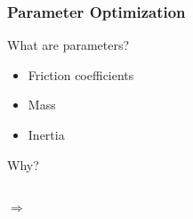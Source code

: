 \begin{frame}[c]
	\frametitle{Parameter Optimization}
	What are parameters?
	\begin{itemize}
		\item{Friction coefficients}
		\item{Mass}
		\item{Inertia}
	\end{itemize}
	
	\vspace{0.5cm}
	
	Why?
	
	\vspace{0.5cm}
	
	\begin{columns}
			\centering
			\centering
			$\Rightarrow$
	\end{columns}
\end{frame}


